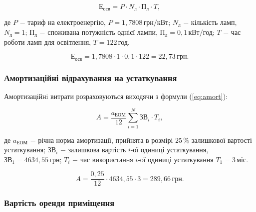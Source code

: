 \begin{equation}\label{eq:osv}
\text{Е}_{\text{осв}} = P \cdot N_{\text{л}} \cdot \text{П}_{\text{л}} \cdot T,
\end{equation}

\noindent де $P$ $-$ тариф на електроенергію, $P = 1,7808 \, \text{грн}/\text{кВт}$; \newline
\hspace*{15pt}$N_{\text{л}}$ $-$ кількість ламп, $N_{\text{л}} = 1$;\newline
\hspace*{15pt}$\text{П}_{\text{л}}$ $-$ споживана потужність однієї лампи, $\text{П}_{\text{л}} = 0,1 \, \text{кВт}/\text{год}$;\newline
\hspace*{15pt}$T$ $-$ час роботи ламп для освітлення, $T = 122 \, \text{год}$.

\[
\text{Е}_{\text{осв}} = 1,7808 \cdot 1 \cdot 0,1 \cdot 122 = 22,73 \, \text{грн}.
\]

\vspace{1.5em}

\subsubsection{Амортизаційні відрахування на устаткування}

Амортизацiйнi витрати розраховуються виходячи з формули (\ref{eq:amort}):

\begin{equation}\label{eq:amort}
A = \frac{a_{\text{ЕОМ}}}{12}\sum_{i=1}^{N}\text{ЗВ}_{i} \cdot T_{i},
\end{equation}

\noindent де $a_{\text{ЕОМ}}$ $-$ річна норма амортизації, прийнята в розмірі $ 25 \, \%$ залишкової вартості устаткування;\newline
\hspace*{23pt}$\text{ЗВ}_{i}$ $-$ залишкова вартість $i$-ої одиниці устаткування, $\text{ЗВ}_{1} = 4634,55 \, \text{грн}$;\newline
\hspace*{23pt}$T_{i}$ $-$ час використання $i$-ої одиниці устаткування $T_{1} = 3 \, \text{міс}$.

\[
A = \frac{0,25}{12} \cdot 4634,55 \cdot 3 = 289,66 \, \text{грн}.
\]

\vspace{1.5em}

\subsubsection{Вартість оренди приміщення}

